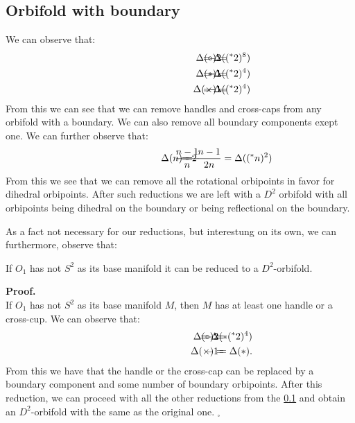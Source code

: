 \subsection{Orbifold with boundary}\label{orbifold_with_boundary}
We can observe that:
\begin{align}
\hspace{3cm}\Delta(\circ) =& \hspace{-1cm} &-2& \hspace{-1cm} &= \Delta((^\ast 2)^8) \\
\hspace{3cm}\Delta(\ast) =& \hspace{-1cm} &-1& \hspace{-1cm} &= \Delta((^\ast 2)^4) \\
\hspace{3cm}\Delta(\times) =& \hspace{-1cm} &-1& \hspace{-1cm} &= \Delta((^\ast 2)^4)
\end{align}
From this we can see that we can remove handles and cross-caps 
from any orbifold with a boundary. 
We can also remove all boundary components exept one.         
We can further observe that:
\begin{align}
\hspace{3cm}\Delta(n) =& \hspace{-1cm} &\frac{n-1}{n}& \hspace{-1cm} 
&= 2\frac{n-1}{2n} &= \Delta((^\ast n)^2)\label{third_reduction}
\end{align}
From this we see that we can remove all the rotational orbipoints in favor for 
dihedral orbipoints.
After such reductions we are left with a $D^2$ orbifold with all orbipoints being dihedral on 
the boundary or being reflectional on the boundary. 

As a fact not necessary for our reductions, but interestung on its own, we can furthermore, 
observe that:
\begin{observation}
If $O_1$ has not $S^2$ as its base manifold it can be reduced to a $D^2$-orbifold.
\end{observation}
\textbf{Proof.} \\
If $O_1$ has not $S^2$ as its base manifold $M$, then $M$ has at least one handle or a cross-cup. We can observe that:
\begin{align}
\hspace{3cm}\Delta(\circ) =& \hspace{-1cm} &-2& \hspace{-1cm} &= \Delta(\ast (^*2)^4) \\
\hspace{3cm}\Delta(\times) =& \hspace{-1cm} &-1& \hspace{-1cm} &= \Delta(\ast).
\end{align}
From this we have that the handle or the cross-cap can be replaced by a boundary component  
and some number of boundary orbipoints. After this reduction, we can proceed with all the 
other reductions from the \ref{orbifold_with_boundary} and obtain an $D^2$-orbifold 
with the same \Eoc as the original one. $_\square$

